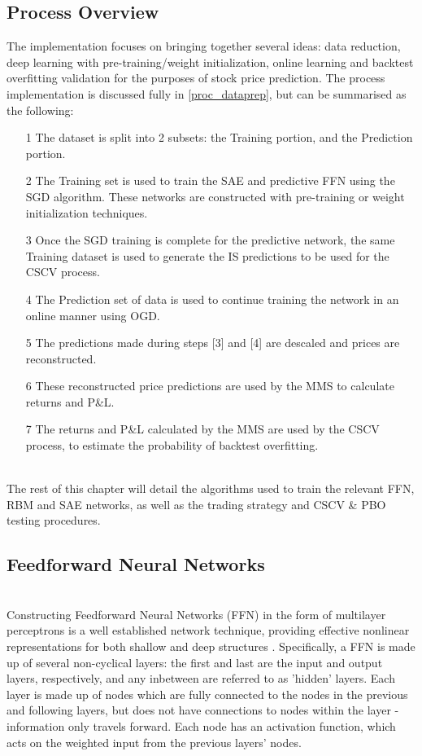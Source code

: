 \documentclass[a4paper,11pt,oneside]{article}
\theoremstyle{plain}
\theoremstyle{definition}
\begin{document}
\subsection{Process Overview}\label{ProcessOverview}\label{imp_overview}


The implementation focuses on bringing together several ideas: data reduction, deep learning with pre-training/weight initialization, online learning and backtest overfitting validation for the purposes of stock price prediction. The process implementation is discussed fully in \ref{proc_dataprep}, but can be summarised as the following:

\begin{itemize}
	\item [1] The dataset is split into 2 subsets: the Training portion, and the Prediction portion.
	\item [2] The Training set is used to train the SAE and predictive FFN using the SGD algorithm. These networks are constructed with pre-training or weight initialization techniques.
	\item [3] Once the SGD training is complete for the predictive network, the same Training dataset is used to generate the IS predictions to be used for the CSCV process.
	\item [4] The Prediction set of data is used to continue training the network in an online manner using OGD.
	\item [5] The predictions made during steps [3] and [4] are descaled and prices are reconstructed.
	\item [6] These reconstructed price predictions are used by the MMS to calculate returns and P\&L.
	\item [7] The returns and P\&L calculated by the MMS are used by the CSCV process, to estimate the probability of backtest overfitting.
\end{itemize}
~\\
The rest of this chapter will detail the algorithms used to train the relevant FFN, RBM and SAE networks, as well as the trading strategy and CSCV \& PBO testing procedures.

\subsection{Feedforward Neural Networks}\label{imp_ffn}
~\\
Constructing Feedforward Neural Networks (FFN) in the form of multilayer perceptrons is a well established network technique, providing effective nonlinear representations for both shallow and deep structures \cite{Schmidhuber}. Specifically, a FFN is made up of several non-cyclical layers: the first and last are the input and output layers, respectively, and any inbetween are referred to as 'hidden' layers. Each layer is made up of nodes which are fully connected to the nodes in the previous and following layers, but does not have connections to nodes within the layer - information only travels forward. Each 
node has an activation function, which acts on the weighted input from the previous layers' nodes.
\end{document}
